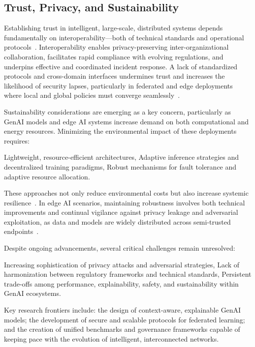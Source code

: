\documentclass[sigconf]{acmart}
\begin{document}
\subsection{Trust, Privacy, and Sustainability}

Establishing trust in intelligent, large-scale, distributed systems depends fundamentally on interoperability—both of technical standards and operational protocols~\cite{ref7,ref17,ref18,ref19,ref20,ref21,ref23,ref24,ref26}. Interoperability enables privacy-preserving inter-organizational collaboration, facilitates rapid compliance with evolving regulations, and underpins effective and coordinated incident response. A lack of standardized protocols and cross-domain interfaces undermines trust and increases the likelihood of security lapses, particularly in federated and edge deployments where local and global policies must converge seamlessly~\cite{ref26}.

Sustainability considerations are emerging as a key concern, particularly as GenAI models and edge AI systems increase demand on both computational and energy resources. Minimizing the environmental impact of these deployments requires:

Lightweight, resource-efficient architectures,
Adaptive inference strategies and decentralized training paradigms,
Robust mechanisms for fault tolerance and adaptive resource allocation.

These approaches not only reduce environmental costs but also increase systemic resilience~\cite{ref7,ref26}. In edge AI scenarios, maintaining robustness involves both technical improvements and continual vigilance against privacy leakage and adversarial exploitation, as data and models are widely distributed across semi-trusted endpoints~\cite{ref48,ref49}.

Despite ongoing advancements, several critical challenges remain unresolved:

Increasing sophistication of privacy attacks and adversarial strategies,
Lack of harmonization between regulatory frameworks and technical standards,
Persistent trade-offs among performance, explainability, safety, and sustainability within GenAI ecosystems.

Key research frontiers include: the design of context-aware, explainable GenAI models; the development of secure and scalable protocols for federated learning; and the creation of unified benchmarks and governance frameworks capable of keeping pace with the evolution of intelligent, interconnected networks.
\end{document}
